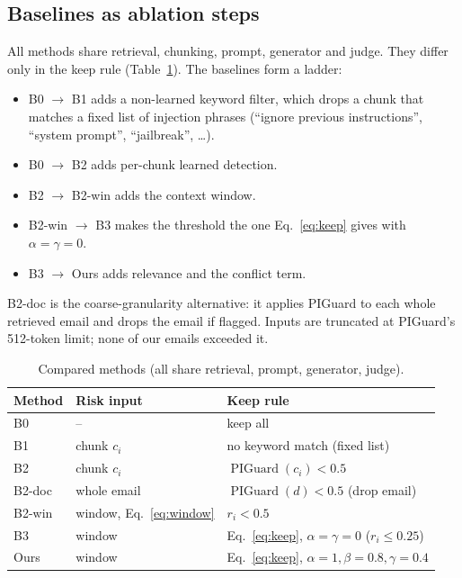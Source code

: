 \documentclass[conference]{IEEEtran}
\newcommand{\PIG}{\operatorname{PIGuard}}
\begin{document}
\subsection{Baselines as ablation steps}
All methods share retrieval, chunking, prompt, generator and judge. They
differ only in the keep rule (Table~\ref{tab:methods}). The baselines form
a ladder:
\begin{itemize}
\item B0 $\rightarrow$ B1 adds a non-learned keyword filter, which drops a
chunk that matches a fixed list of injection phrases (``ignore previous
instructions'', ``system prompt'', ``jailbreak'', \ldots).
\item B0 $\rightarrow$ B2 adds per-chunk learned detection.
\item B2 $\rightarrow$ B2-win adds the context window.
\item B2-win $\rightarrow$ B3 makes the threshold the one Eq.~\eqref{eq:keep}
gives with $\alpha=\gamma=0$.
\item B3 $\rightarrow$ Ours adds relevance and the conflict term.
\end{itemize}
B2-doc is the coarse-granularity alternative: it applies PIGuard to each
whole retrieved email and drops the email if flagged. Inputs are truncated
at PIGuard's 512-token limit; none of our emails exceeded it.

\begin{table}[t]
\caption{Compared methods (all share retrieval, prompt, generator, judge).}
\label{tab:methods}
\centering
\small
\begin{tabular}{@{}lll@{}}
\toprule
Method & Risk input & Keep rule \\
\midrule
B0 & -- & keep all \\
B1 & chunk $c_i$ & no keyword match (fixed list) \\
B2 & chunk $c_i$ & $\PIG(c_i)<0.5$ \\
B2-doc & whole email & $\PIG(d)<0.5$ (drop email) \\
B2-win & window, Eq.~\eqref{eq:window} & $r_i<0.5$ \\
B3 & window & Eq.~\eqref{eq:keep}, $\alpha{=}\gamma{=}0$ ($r_i\le0.25$) \\
Ours & window & Eq.~\eqref{eq:keep}, $\alpha{=}1,\beta{=}0.8,\gamma{=}0.4$ \\
\bottomrule
\end{tabular}
\end{table}

\end{document}
